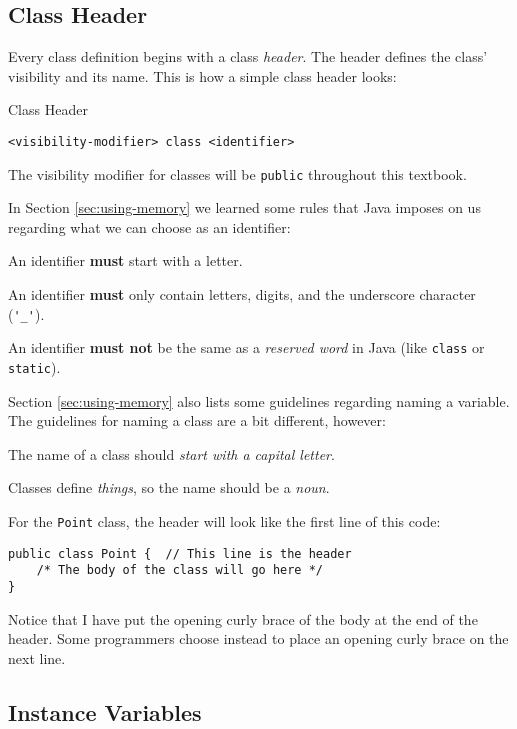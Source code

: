 \subsection{Class Header}

Every class definition begins with a class \textit{header}.  The header defines the class' visibility and its name.  This is how a simple class header looks:

\begin{javaformat}{Class Header}
\begin{verbatim}
<visibility-modifier> class <identifier>
\end{verbatim}
\end{javaformat}

The visibility modifier for classes will be \texttt{public} throughout this textbook.

In Section \ref{sec:using-memory} we learned some rules that Java imposes on us regarding what we can choose as an identifier:
\bi
\item An identifier \textbf{must} start with a letter.
\item An identifier \textbf{must} only contain letters, digits, and the underscore character (\lstinline{'_'}).
\item An identifier \textbf{must not} be the same as a \textit{reserved word} in Java (like \lstinline{class} or \lstinline{static}).
\ei

Section \ref{sec:using-memory} also lists some guidelines regarding naming a variable.  The guidelines for naming a class are a bit different, however:
\bi
\item The name of a class should \textit{start with a capital letter}.
\item Classes define \textit{things}, so the name should be a \textit{noun}.
\ei

For the \texttt{Point} class, the header will look like the first line of this code:

\begin{verbatim}
public class Point {  // This line is the header
    /* The body of the class will go here */
}
\end{verbatim}

Notice that I have put the opening curly brace of the body at the end of the header.  Some programmers choose instead to place an opening curly brace on the next line.

\subsection{Instance Variables}


